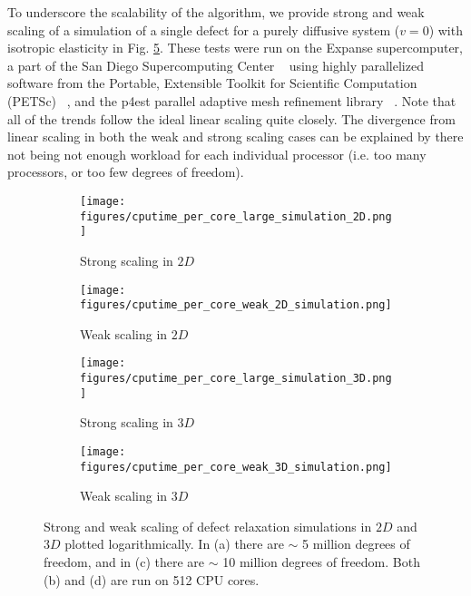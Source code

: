 \documentclass[reqno]{article}
\begin{document}
  To underscore the scalability of the algorithm, we provide strong and weak
  scaling of a simulation of a single defect for a purely diffusive system ($v =
  0$) with isotropic elasticity in Fig. \ref{fig:simulation-scaling}.
  These tests were run on the Expanse supercomputer, a part of the San Diego
  Supercomputing Center ~\cite{strande_expanse_2021} using highly parallelized
  software from the Portable, Extensible Toolkit for Scientific Computation
  (PETSc) ~\cite{petsc-web-page, petsc-user-ref, petsc-efficient}, and the p4est
  parallel adaptive mesh refinement library ~\cite{BursteddeWilcoxGhattas11}.
  Note that all of the trends follow the ideal linear scaling quite closely.
  The divergence from linear scaling in both the weak and strong scaling cases
  can be explained by there not being not enough workload for each individual
  processor (i.e. too many processors, or too few degrees of freedom).
  
  \begin{figure}[h]
    \centering
    \begin{subfigure}{0.45\textwidth}
      \texttt{[image: figures/cputime\_per\_core\_large\_simulation\_2D.png]}
      \caption{Strong scaling in $2D$}
      \label{fig:2D-strong-scaling}
    \end{subfigure}
    \hfill
    \begin{subfigure}{0.45\textwidth}
      \texttt{[image: figures/cputime\_per\_core\_weak\_2D\_simulation.png]}
      \caption{Weak scaling in $2D$}
      \label{fig:2D-weak-scaling}
    \end{subfigure}
    \hfill
    \begin{subfigure}{0.45\textwidth}
      \texttt{[image: figures/cputime\_per\_core\_large\_simulation\_3D.png]}
      \caption{Strong scaling in $3D$}
      \label{fig:3D-strong-scaling}
    \end{subfigure}
    \hfill
    \begin{subfigure}{0.45\textwidth}
      \texttt{[image: figures/cputime\_per\_core\_weak\_3D\_simulation.png]}
      \caption{Weak scaling in $3D$}
      \label{fig:3D-weak-scaling}
    \end{subfigure}
    \caption{Strong and weak scaling of defect relaxation simulations in $2D$
      and $3D$ plotted logarithmically. In (a) there are $\sim$ 5 million degrees
      of freedom, and in (c) there are $\sim$ 10 million degrees of freedom.
      Both (b) and (d) are run on 512 CPU cores.}
    \label{fig:simulation-scaling}
  \end{figure}
  
\end{document}
